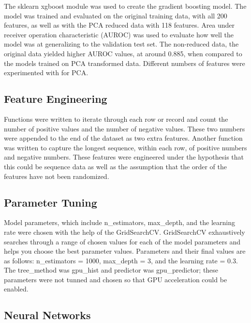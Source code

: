 \documentclass[11pt,letterpaper]{article}
\begin{document}

The sklearn xgboost module was used to create the gradient boosting model. The
model was trained and evaluated on the original training data, with all 200
features, as well as with the PCA reduced data with 118 features.  Area under
receiver operation characteristic (AUROC) was used to evaluate how well the
model was at generalizing to the validation test set.  The non-reduced data, the
original data yielded higher AUROC values, at around 0.885, when compared to the
models trained on PCA transformed data.  Different numbers of features were
experimented with for PCA. 

\subsection{Feature Engineering}

Functions were written to iterate through each row or record and count the
number of positive values and the number of negative values.  These two numbers
were appended to the end of the dataset as two extra features.  Another function
was written to capture the longest sequence, within each row, of positive
numbers and negative numbers.  These features were engineered under the
hypothesis that this could be sequence data as well as the  assumption that the
order of the features have not been randomized. 

\subsection{Parameter Tuning}

Model parameters, which include n\_estimators, max\_depth, and the learning rate
were chosen with the help of the GridSearchCV.  GridSearchCV exhaustively
searches through a range of chosen values for each of the model parameters and
helps you choose the best parameter values.  Parameters and their final values
are as follows: n\_estimators = 1000, max\_depth = 3, and the learning rate =
0.3. The tree\_method was gpu\_hist and predictor was gpu\_predictor; these
parameters were not tunned and chosen so that GPU acceleration could be
enabled.   

\iffalse
\subsection{Neural Networks}
\end{document}
